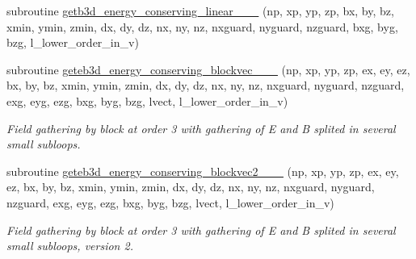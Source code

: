 \begin{DoxyCompactItemize}
\item 
subroutine \hyperlink{field__gathering__3d__o3_8_f90_af2124c863ea5023482442eca03daff98}{getb3d\+\_\+energy\+\_\+conserving\+\_\+linear\+\_\+\_\+\_} (np, xp, yp, zp, bx, by, bz, xmin, ymin, zmin,                                                                                                                                                           dx, dy, dz, nx, ny, nz, nxguard, nyguard, nzguard,                                                                                                                                                   bxg, byg, bzg, l\+\_\+lower\+\_\+order\+\_\+in\+\_\+v)
\item 
subroutine \hyperlink{field__gathering__3d__o3_8_f90_aa5a8d5eebf404fdfb772d90bf39cd947}{geteb3d\+\_\+energy\+\_\+conserving\+\_\+blockvec\+\_\+\_\+\_} (np, xp, yp, zp, ex, ey, ez, bx, by, bz,                                                                                                                                                                       xmin, ymin, zmin,                                                                                                                                                                                               dx, dy, dz, nx, ny, nz, nxguard, nyguard, nzguard,                                                                                                                                                                       exg, eyg, ezg, bxg, byg, bzg, lvect, l\+\_\+lower\+\_\+order\+\_\+in\+\_\+v)
\begin{DoxyCompactList}\small\item\em Field gathering by block at order 3 with gathering of E and B splited in several small subloops. \end{DoxyCompactList}\item 
subroutine \hyperlink{field__gathering__3d__o3_8_f90_aa724510149f9ad46a950d576006e248f}{geteb3d\+\_\+energy\+\_\+conserving\+\_\+blockvec2\+\_\+\_\+\_} (np, xp, yp, zp, ex, ey, ez, bx, by, bz,                                                                                                                                                                       xmin, ymin, zmin,                                                                                                                                                                                               dx, dy, dz, nx, ny, nz, nxguard, nyguard, nzguard,                                                                                                                                                                       exg, eyg, ezg, bxg, byg, bzg, lvect, l\+\_\+lower\+\_\+order\+\_\+in\+\_\+v)
\begin{DoxyCompactList}\small\item\em Field gathering by block at order 3 with gathering of E and B splited in several small subloops, version 2. \end{DoxyCompactList}\end{DoxyCompactItemize}


